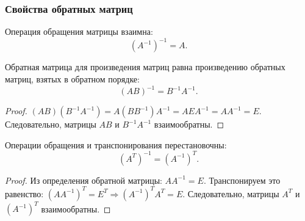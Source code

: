 \documentclass[10pt]{article}
\begin{document}
\subsubsection*{Свойства обратных матриц}

\begin{property}
Операция обращения матрицы взаимна:
\[
(A^{-1})^{-1} = A.
\]
\end{property}

\begin{property}
Обратная матрица для произведения матриц равна произведению обратных матриц, взятых в обратном порядке:
\[
(AB)^{-1} = B^{-1} A^{-1}.
\]
\end{property}

\begin{proof}
\((AB)(B^{-1}A^{-1}) = A(B B^{-1}) A^{-1} = A E A^{-1} = A A^{-1} = E\). Следовательно, матрицы \(AB\) и \(B^{-1}A^{-1}\) взаимообратны.
\end{proof}

\begin{property}
Операции обращения и транспонирования перестановочны:
\[
(A^{T})^{-1} = (A^{-1})^{T}.
\]
\end{property}

\begin{proof}
Из определения обратной матрицы: \(A A^{-1} = E\). Транспонируем это равенство: \((A A^{-1})^{T} = E^{T} \Rightarrow (A^{-1})^{T} A^{T} = E\). Следовательно, матрицы \(A^{T}\) и \((A^{-1})^{T}\) взаимообратны.
\end{proof}
\end{document}
